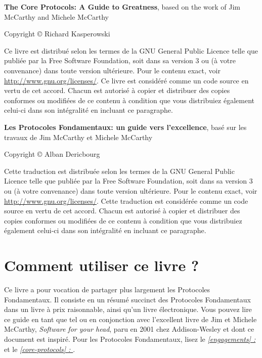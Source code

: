 \documentclass[paper=6in:9in,pagesize=pdftex,headinclude=on,footinclude=on,12pt]{scrbook}
\newcommand*{\fullref}[1]{\textit{\hyperref[{#1}]{\autoref*{#1} : \nameref*{#1}}}}
\begin{document}
\begin{samepage}
	\noindent \textbf{The Core Protocols: A Guide to Greatness}, based on the work of Jim McCarthy and Michele McCarthy

	\noindent Copyright \copyright{} Richard Kasperowski

	\noindent Ce livre est distribué selon les termes de la GNU General Public Licence telle que publiée par la Free Software
	Foundation, soit dans sa version 3 ou (à votre convenance) dans toute version ultérieure. Pour le contenu exact, voir
	\url{http://www.gnu.org/licenses/}. Ce livre est considéré comme un code source en vertu de cet accord. Chacun est autorisé
	à copier et distribuer des copies conformes ou modifiées de ce contenu à condition que vous distribuiez également celui-ci
	dans son intégralité en incluant ce paragraphe.
\end{samepage}

\begin{samepage}
	\noindent \textbf{Les Protocoles Fondamentaux: un guide vers l'excellence}, basé sur les travaux de Jim McCarthy et Michele McCarthy

	\noindent Copyright \copyright{} Alban Dericbourg

	\noindent Cette traduction est distribuée selon les termes de la GNU General Public Licence telle que publiée par la Free Software
	Foundation, soit dans sa version 3 ou (à votre convenance) dans toute version ultérieure. Pour le contenu exact, voir
	\url{http://www.gnu.org/licenses/}. Cette traduction est considérée comme un code source en vertu de cet accord. Chacun est autorisé
	à copier et distribuer des copies conformes ou modifiées de ce contenu à condition que vous distribuiez également celui-ci
	dans son intégralité en incluant ce paragraphe.
\end{samepage}

\mainmatter

\chapter{Comment utiliser ce livre ?} \label{utiliser-ce-livre}

Ce livre a pour vocation de partager plus largement les Protocoles Fondamentaux. Il consiste en un résumé succinct des
Protocoles Fondamentaux dans un livre à prix raisonnable, ainsi qu'un livre électronique. Vous pouvez lire ce guide en tant que
tel ou en conjonction avec l'excellent livre de Jim et Michele McCarthy, \emph{Software for your head}, paru en 2001
chez Addison-Wesley et dont ce document est inspiré. Pour les Protocoles Fondamentaux, lisez le \fullref{engagements}
et le \fullref{core-protocols}.
\end{document}
